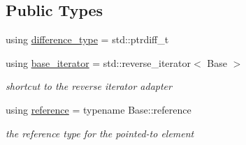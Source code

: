 \subsection*{Public Types}
\begin{DoxyCompactItemize}
\item 
using \mbox{\hyperlink{classnlohmann_1_1detail_1_1json__reverse__iterator_a9ab55987c05ec6427ad36082e351cc45}{difference\+\_\+type}} = std\+::ptrdiff\+\_\+t
\item 
using \mbox{\hyperlink{classnlohmann_1_1detail_1_1json__reverse__iterator_a6b2ef1d632fe49bfcc22fbd1abd62395}{base\+\_\+iterator}} = std\+::reverse\+\_\+iterator$<$ Base $>$
\begin{DoxyCompactList}\small\item\em shortcut to the reverse iterator adapter \end{DoxyCompactList}\item 
using \mbox{\hyperlink{classnlohmann_1_1detail_1_1json__reverse__iterator_a42f51a69bac7b2aebb613b2164e457f1}{reference}} = typename Base\+::reference
\begin{DoxyCompactList}\small\item\em the reference type for the pointed-\/to element \end{DoxyCompactList}\end{DoxyCompactItemize}
